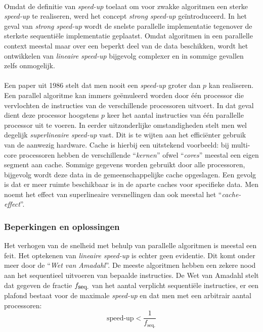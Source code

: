 \paragraph{}
Omdat de definitie van \emph{speed-up} toelaat om voor zwakke algoritmen een sterke \emph{speed-up} te realiseren, werd het concept \emph{strong speed-up} ge\"introduceerd. In het geval van \emph{strong speed-up} wordt de snelste parallelle implementatie tegenover de sterkste sequenti\"ele implementatie geplaatst. Omdat algoritmen in een parallelle context meestal maar over een beperkt deel van de data beschikken, wordt het ontwikkelen van \emph{lineaire speed-up} bijgevolg complexer en in sommige gevallen zelfs onmogelijk.\cite{Alba2005book}

\paragraph{}
Een paper uit 1986\cite{journals/pc/FaberLW86} stelt dat men nooit een \emph{speed-up} groter dan $p$ kan realiseren. Een parallel algoritme kan immers ge\"emuleerd worden door \'e\'en processor die vervlochten de instructies van de verschillende processoren uitvoert. In dat geval dient deze processor hoogstens $p$ keer het aantal instructies van \'e\'en parallelle processor uit te voeren. In eerder uitzonderlijke omstandigheden stelt men wel degelijk \emph{superlineaire speed-up} vast. Dit is te wijten aan het effici\"enter gebruik van de aanwezig hardware. Cache is hierbij een uitstekend voorbeeld: bij multi-core processoren hebben de verschillende ``\emph{kernen}'' ofwel ``\emph{cores}'' meestal een eigen segment aan cache. Sommige gegevens worden gebruikt door alle processoren, bijgevolg wordt deze data in de gemeenschappelijke cache opgeslagen. Een gevolg is dat er meer ruimte beschikbaar is in de aparte caches voor specifieke data. Men noemt het effect van superlineaire versnellingen dan ook meestal het ``\emph{cache-effect}''\cite{cacheEffect,superlineairspeedup,journals/pc/Janssen87,journals/pc/Parkinson86}.

\subsubsection{Beperkingen en oplossingen}

Het verhogen van de snelheid met behulp van parallelle algoritmen is meestal een feit. Het optekenen van \emph{lineaire speed-up} is echter geen evidentie. Dit komt onder meer door de ``\emph{Wet van Amadahl}''\cite{Amdahl:1967:VSP:1465482.1465560}. De meeste algoritmen hebben een zekere nood aan het sequentieel uitvoeren van bepaalde instructies. De Wet van Amadahl stelt dat gegeven de fractie $f_{\mbox{\small{seq.}}}$ van het aantal verplicht sequenti\"ele instructies, er een plafond bestaat voor de maximale \emph{speed-up} en dat men met een arbitrair aantal processoren:
\begin{equation}
\mbox{speed-up}<\displaystyle\frac{1}{f_{\mbox{seq.}}}
\end{equation}


